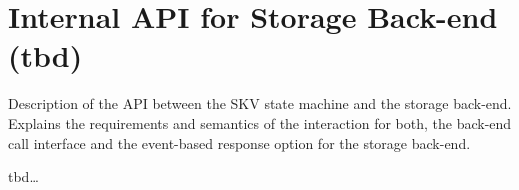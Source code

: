 %

\section{Internal API for Storage Back-end (tbd)}\label{sec:intapi}

Description of the API between the SKV state machine and the storage
back-end.  Explains the requirements and semantics of the interaction
for both, the back-end call interface and the event-based response
option for the storage back-end.

tbd\dots

\endinput



